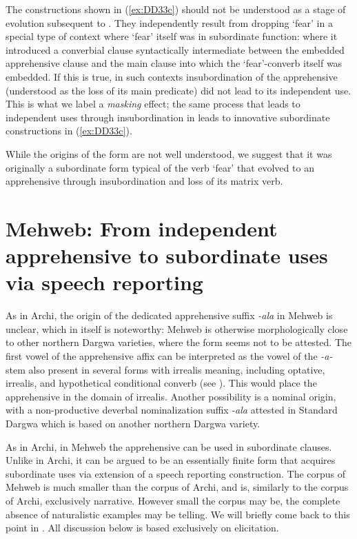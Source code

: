 \documentclass[output=paper,colorlinks,citecolor=brown]{langscibook}
\begin{document}
\noindent The constructions shown in (\ref{ex:DD33c}) should not be understood as a stage of evolution subsequent to . They independently result from dropping `fear' in a special type of context where `fear' itself was in subordinate function: where it introduced a converbial clause syntactically intermediate between the embedded apprehensive clause and the main clause into which the `fear'-converb itself was embedded. If this is true, in such contexts insubordination of the apprehensive (understood as the loss of its main predicate) did not lead to its independent use. This is what we label a \textit{masking} effect; the same process that leads to independent uses through insubordination in  leads to innovative subordinate constructions in (\ref{ex:DD33c}).  

While the origins of the form are not well understood, we suggest that it was originally a subordinate form typical of the verb `fear' that evolved to an apprehensive through insubordination and loss of its matrix verb. 
 
 
 
 
 
 

\section{Mehweb: From independent apprehensive to subordinate uses via speech reporting}
\label{sec:Mehweb}
 
As in Archi, the origin of the dedicated apprehensive suffix \textit{-ala} in Mehweb is unclear, which in itself is noteworthy: Mehweb is otherwise morphologically close to other northern Dargwa varieties, where the form seems not to be attested. The first vowel of the apprehensive affix can be interpreted as the vowel of the \textit{-a-} stem also present in several forms with irrealis meaning, including optative, irrealis, and hypothetical conditional converb (see \citealt{Daniel2019,Dobrushina2019}). This would place the apprehensive in the domain of irrealis. Another possibility is a nominal origin, with a non-productive deverbal nominalization suffix \nobreakdash-\textit{ala} attested in Standard Dargwa which is based on another northern Dargwa variety. 

As in Archi, in Mehweb the apprehensive can be used in subordinate clauses. Unlike in Archi, it can be argued to be an essentially finite form that acquires subordinate uses via extension of a speech reporting construction. The corpus of Mehweb is much smaller than the corpus of Archi, and is, similarly to the corpus of Archi, exclusively narrative. However small the corpus may be, the complete absence of naturalistic examples may be telling. We will briefly come back to this point in . All discussion below is based exclusively on elicitation.
\end{document}

